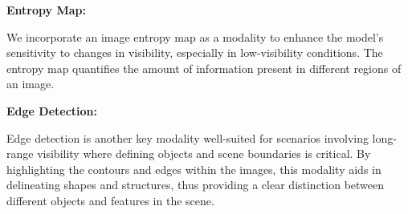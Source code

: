 \textbf{Entropy Map:}

We incorporate an image entropy map as a modality to enhance the model's sensitivity to changes in visibility, especially in low-visibility conditions. The entropy map quantifies the amount of information present in different regions of an image. 




\textbf{Edge Detection:}

Edge detection is another key modality well-suited for scenarios involving long-range visibility where defining objects and scene boundaries is critical. By highlighting the contours and edges within the images, this modality aids in delineating shapes and structures, thus providing a clear distinction between different objects and features in the scene. 


